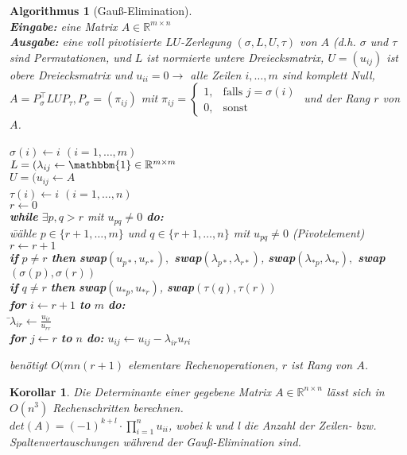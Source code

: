 \documentclass[12pt,a4paper]{article}
\theoremstyle{plain}
\newtheorem{Korollar}[Theorem]{Korollar}
\newtheorem{Algorithmus}[Theorem]{Algorithmus}
\newcommand{\R}{\mathbb{R}}
\numberwithin{equation}{section}
\begin{document}
\begin{Algorithmus}[Gauß-Elimination]\label{Gauss-Elim}\\
\textbf{Eingabe:} eine Matrix $A\in\R^{m\times n}$\\
\textbf{Ausgabe:} eine voll pivotisierte $LU$-Zerlegung $(\sigma,L,U,\tau)$ von $A$ (d.h. $\sigma$ und $\tau$ sind Permutationen, und $L$ ist normierte untere Dreiecksmatrix, $U=(u_{ij})$ ist obere Dreiecksmatrix und $u_{ii}=0 \rightarrow$ alle Zeilen $i,\ldots,m$ sind komplett Null, $A=P_{\sigma}^\intercal LUP_{\tau}, P_{\sigma}=(\pi_{ij})$ mit $\pi_{ij}=\left\lbrace\begin{array}{ll}1,&\text{falls }j=\sigma(i)\\ 0,&\text{sonst}\end{array}\right.$ und der Rang $r$ von $A$.
\begin{tabbing}
$\sigma(i)\gets i$  $(i=1,\ldots,m)$\\
$L=(\lambda_{ij}\gets \mathbbm{1}\in\R^{m\times m}$\\
$U=(u_{ij}\gets A$\\
$\tau(i)\gets i$  $(i=1,\ldots,n)$\\
$r\gets 0$\\
\textbf{while }$\exists p,q> r$ mit $u_{pq}\neq 0$ \textbf{do:}\\
\text{\qquad}\=wähle $p\in\{r+1,\ldots,m\}$ und $q\in\{r+1,\ldots,n\}$ mit $u_{pq}\neq 0$ (Pivotelement)\+ \\
$r\gets r+1$\\
\textbf{if} $p\neq r$ \textbf{then} \textbf{swap}$(u_{p*},u_{r*}),$ \textbf{swap}$(\lambda_{p*},\lambda_{r*})$, \textbf{swap}$(\lambda_{*p},\lambda_{*r}),$ \textbf{swap}$(\sigma(p),\sigma(r))$\\
\textbf{if} $q\neq r$ \textbf{then} \textbf{swap}$(u_{*p},u_{*r})$, \textbf{swap}$(\tau(q),\tau(r))$\\
\textbf{for} $i\gets r+1$ \textbf{to} $m$ \textbf{do:}\\
\text{\qquad}\=$\lambda_{ir}\gets\frac{u_{ir}}{u_{rr}}$\+\\
\textbf{for} $j\gets r$ \textbf{to} $n$ \textbf{do:} $u_{ij}\gets u_{ij}-\lambda_{ir}u_{ri}$
\end{tabbing}
benötigt $O(mn(r+1)$ elementare Rechenoperationen, $r$ ist Rang von $A$.
\end{Algorithmus}
\begin{Korollar}
Die Determinante einer gegebene Matrix $A\in\R^{n\times n}$ lässt sich in $O(n^3)$ Rechenschritten berechnen.\\
$det(A)=(-1)^{k+l}\cdot\prod_{i=1}^n{u_{ii}}$, wobei k und l die Anzahl der Zeilen- bzw. Spaltenvertauschungen während der Gauß-Elimination sind.
\end{Korollar}
\end{document}
